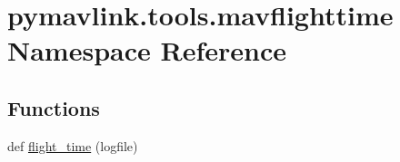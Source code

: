 \hypertarget{namespacepymavlink_1_1tools_1_1mavflighttime}{}\section{pymavlink.\+tools.\+mavflighttime Namespace Reference}
\label{namespacepymavlink_1_1tools_1_1mavflighttime}
\subsection*{Functions}
\begin{DoxyCompactItemize}
\item 
def \mbox{\hyperlink{namespacepymavlink_1_1tools_1_1mavflighttime_a20110edf75eca397a2929bc07ce011ca}{flight\+\_\+time}} (logfile)
\end{DoxyCompactItemize}
